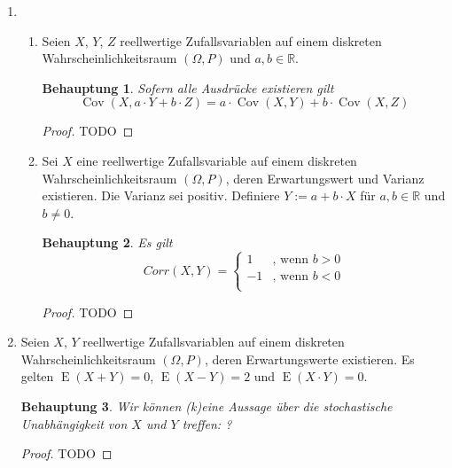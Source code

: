 \documentclass[a4paper]{scrartcl}
\newtheorem*{behaupt}{Behauptung}
\newcommand{\cov}{\operatorname{Cov}}
\newcommand{\e}{\operatorname{E}}
\begin{document}
\begin{enumerate}[label=\bfseries\arabic*.]
    \item
        \begin{enumerate}[label=(\alph*)]
            \item
                Seien $X$, $Y$, $Z$ reellwertige Zufallsvariablen auf einem
                diskreten Wahrscheinlichkeitsraum $(\Omega, P)$ und
                $a, b \in \mathbb{R}$.
                \begin{behaupt}
                    Sofern alle Ausdrücke existieren gilt
                    \begin{equation*}
                        \cov(X, a \cdot Y + b \cdot Z)
                        = a \cdot \cov(X, Y) + b \cdot \cov(X, Z)
                    \end{equation*}
                \end{behaupt}
                \begin{proof}
                    TODO
                \end{proof}

            \item
                Sei $X$ eine reellwertige Zufallsvariable auf einem diskreten
                Wahrscheinlichkeitsraum $(\Omega, P)$, deren Erwartungswert und
                Varianz existieren.
                Die Varianz sei positiv.
                Definiere $Y := a + b \cdot X$ für $a, b \in \mathbb{R}$ und
                $b \neq 0$.
                \begin{behaupt}
                    Es gilt
                    \begin{equation*}
                        Corr(X, Y) =
                        \begin{cases}
                             1 & \text{, wenn } b > 0 \\
                            -1 & \text{, wenn } b < 0 \\
                        \end{cases}
                    \end{equation*}
                \end{behaupt}
                \begin{proof}
                    TODO
                \end{proof}

        \end{enumerate}

    \item
        Seien $X$, $Y$ reellwertige Zufallsvariablen auf einem diskreten
        Wahrscheinlichkeitsraum $(\Omega, P)$, deren Erwartungswerte
        existieren.
        Es gelten $\e(X+Y) = 0$, $\e(X-Y) = 2$ und $\e(X \cdot Y) = 0$.
        \begin{behaupt}
            Wir können (k)eine Aussage über die stochastische Unabhängigkeit
            von $X$ und $Y$ treffen: ?
        \end{behaupt}
        \begin{proof}
            TODO
        \end{proof}

\end{enumerate}
\end{document}
